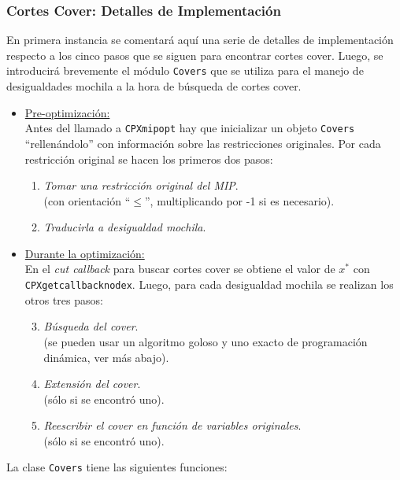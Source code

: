 \subsubsection{Cortes Cover: Detalles de Implementación}

En primera instancia se comentará aquí una serie de detalles de implementación respecto a los cinco pasos que se siguen para encontrar cortes cover. Luego, se introducirá brevemente el módulo \verb_Covers_ que se utiliza para el manejo de desigualdades mochila a la hora de búsqueda de cortes cover.

\begin{itemize}
\item \underline{Pre-optimización:}\\
Antes del llamado a \verb_CPXmipopt_ hay que inicializar un objeto \verb_Covers_ ``rellenándolo'' con información sobre las restricciones originales. Por cada restricción original se hacen los primeros dos pasos:
	\begin{enumerate}[1{)}]
	\item \emph{Tomar una restricción original del MIP}.\\
		(con orientación ``$\leq$'', multiplicando por -1 si es necesario).
	\item \emph{Traducirla a desigualdad mochila}.
	\end{enumerate}

\item \underline{Durante la optimización:}\\
En el \emph{cut callback} para buscar cortes cover se obtiene el valor de $x^*$ con \verb_CPXgetcallbacknodex_. Luego, para cada desigualdad mochila se realizan los otros tres pasos:
	\begin{enumerate}[1{)}]
	\setcounter{enumi}{2}
	\item \emph{Búsqueda del cover}.\\
		(se pueden usar un algoritmo goloso y uno exacto de programación dinámica, ver más abajo).
	\item \emph{Extensión del cover}.\\
		(sólo si se encontró uno).
	\item \emph{Reescribir el cover en función de variables originales}.\\
		(sólo si se encontró uno).
	\end{enumerate}
\end{itemize}

La clase \verb_Covers_ tiene las siguientes funciones:

